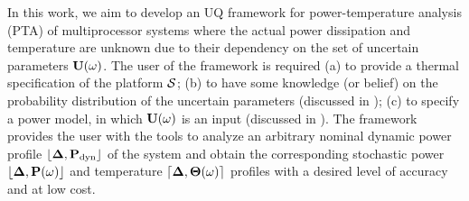 In this work, we aim to develop an UQ framework for power-temperature analysis (PTA) of multiprocessor systems where the actual power dissipation and temperature are unknown due to their dependency on the set of uncertain parameters $\mathbf{U}(\omega)$. The user of the framework is required (a) to provide a thermal specification of the platform $\mathcal{S}$; (b) to have some knowledge (or belief) on the probability distribution of the uncertain parameters (discussed in ); (c) to specify a power model, in which $\mathbf{U}(\omega)$ is an input (discussed in ). The framework provides the user with the tools to analyze an arbitrary nominal dynamic power profile $\profPdyn$ of the system and obtain the corresponding stochastic power $\profP{\o}$ and temperature $\profT{\o}$ profiles with a desired level of accuracy and at low cost.
